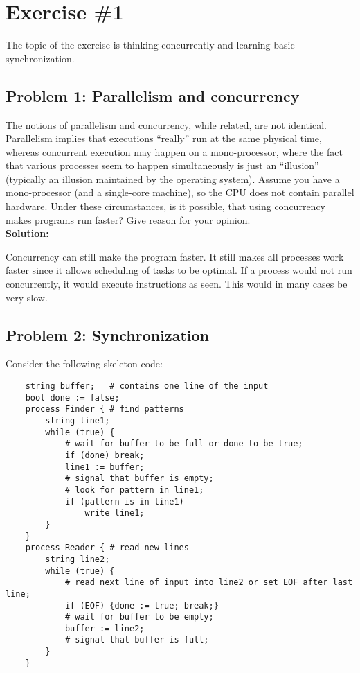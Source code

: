 \section{Exercise \#1}

The topic of the exercise is thinking concurrently and learning basic synchronization. 

\subsection{Problem 1: Parallelism and concurrency}

The notions of parallelism and concurrency, while
related, are not identical. Parallelism implies that executions “really” run at the same physical
time, whereas concurrent execution may happen on a mono-processor, where the fact that various
processes seem to happen simultaneously is just an “illusion” (typically an illusion maintained
by the operating system). Assume you have a mono-processor (and a single-core machine), so the CPU does not contain
parallel hardware. Under these circumstances, is it possible, that using concurrency makes
programs run faster? Give reason for your opinion. \\ 

\textbf{Solution:}

Concurrency can still make the program faster. 
It still makes all processes work faster since it allows scheduling of tasks to be optimal.
If a process would not run concurrently, it would execute instructions as seen.
This would in many cases be very slow.


\subsection{Problem 2: Synchronization}

Consider the following skeleton code:

\begin{lstlisting}
    string buffer;   # contains one line of the input
    bool done := false;
    process Finder { # find patterns
        string line1;
        while (true) {
            # wait for buffer to be full or done to be true;
            if (done) break;
            line1 := buffer;
            # signal that buffer is empty;
            # look for pattern in line1;
            if (pattern is in line1)
                write line1;
        }
    }
    process Reader { # read new lines
        string line2;
        while (true) {
            # read next line of input into line2 or set EOF after last line;
            if (EOF) {done := true; break;}
            # wait for buffer to be empty;
            buffer := line2;
            # signal that buffer is full;
        }
    }
\end{lstlisting}


